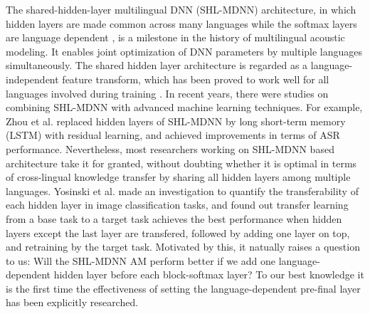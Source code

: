 \documentclass[a4paper]{article}
\begin{document}
The shared-hidden-layer multilingual DNN (SHL-MDNN) architecture, in which hidden layers are made common across many languages while the softmax layers are language dependent \cite{Huang2013cross}, is a milestone in the history of multilingual acoustic modeling. It enables joint optimization of DNN parameters by multiple languages simultaneously. The shared hidden layer architecture is regarded as a language-independent feature transform, which has been proved to work well for all languages involved during training \cite{Huang2013cross}.
In recent years, there were studies on combining SHL-MDNN with advanced machine learning techniques.
For example, Zhou et al. \cite{Zhou2017} replaced hidden layers of SHL-MDNN by long short-term memory (LSTM) with  residual learning, and achieved improvements in terms of  ASR performance.
Nevertheless, most researchers working on SHL-MDNN based architecture take it for granted, without doubting whether it is optimal in terms of cross-lingual knowledge transfer by sharing all hidden layers among multiple languages. Yosinski et al. \cite{yosinski2014transferable} made an investigation to quantify the transferability of each hidden layer in image classification tasks, and found out transfer learning from a base task to a target task achieves the best performance when hidden layers except the last layer are transfered, followed by adding one layer on top, and retraining by the target task.
Motivated by this, it natually raises a question  to us:
Will the SHL-MDNN AM perform better if we add one  language-dependent hidden layer before each block-softmax layer? To our best knowledge it is the first time the effectiveness of setting the language-dependent pre-final layer has been explicitly researched.
\end{document}
